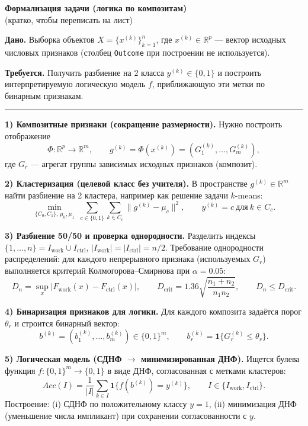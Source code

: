 \documentclass[a4paper,12pt]{article}
\begin{document}
\begin{center}
{\Large \textbf{Формализация задачи (логика по композитам)}}\\
\vspace{2pt}
{\small (кратко, чтобы переписать на лист)}
\end{center}

\textbf{Дано.}
Выборка объектов \(X=\{x^{(k)}\}_{k=1}^{n}\), где \(x^{(k)}\in\mathbb{R}^{p}\) --- вектор исходных числовых признаков (столбец \texttt{Outcome} при построении не используется).

\textbf{Требуется.}
Получить разбиение на 2 класса \(y^{(k)}\in\{0,1\}\) и построить интерпретируемую логическую модель \(f\), приближающую эти метки по бинарным признакам.

\hrule

\textbf{1) Композитные признаки (сокращение размерности).}
Нужно построить отображение
\[
\Phi:\mathbb{R}^{p}\to\mathbb{R}^{m},\qquad g^{(k)}=\Phi(x^{(k)})=(G_1^{(k)},\dots,G_m^{(k)}),
\]
где \(G_r\) --- агрегат группы зависимых исходных признаков (композит).

\textbf{2) Кластеризация (целевой класс без учителя).}
В пространстве \(g^{(k)}\in\mathbb{R}^{m}\) найти разбиение на 2 кластера, например как решение задачи \(k\)-means:
\[
\min_{\{C_0,C_1\},\,\mu_0,\mu_1}\;\sum_{c\in\{0,1\}}\sum_{k\in C_c}\|g^{(k)}-\mu_c\|^2,
\qquad y^{(k)}=c\ \text{для}\ k\in C_c.
\]

\textbf{3) Разбиение 50/50 и проверка однородности.}
Разделить индексы \(\{1,\dots,n\}=I_{\text{work}}\cup I_{\text{ctrl}}\), \(|I_{\text{work}}|=|I_{\text{ctrl}}|=n/2\).
Требование однородности распределений: для каждого непрерывного признака (используемых \(G_r\)) выполняется критерий Колмогорова--Смирнова при \(\alpha=0.05\):
\[
D_n=\sup_x\bigl|F_{\text{work}}(x)-F_{\text{ctrl}}(x)\bigr|,\qquad
D_{\text{crit}}=1.36\sqrt{\frac{n_1+n_2}{n_1n_2}},\qquad
D_n\le D_{\text{crit}}.
\]

\textbf{4) Бинаризация признаков для логики.}
Для каждого композита задаётся порог \(\theta_r\) и строится бинарный вектор:
\[
b^{(k)}=(b_1^{(k)},\dots,b_m^{(k)})\in\{0,1\}^m,\qquad
b_r^{(k)}=\mathbf{1}\{G_r^{(k)}\le \theta_r\}.
\]

\textbf{5) Логическая модель (СДНФ \(\rightarrow\) минимизированная ДНФ).}
Ищется булева функция \(f:\{0,1\}^m\to\{0,1\}\) в виде ДНФ, согласованная с метками кластеров:
\[
Acc(I)=\frac{1}{|I|}\sum_{k\in I}\mathbf{1}\{f(b^{(k)})=y^{(k)}\},\qquad I\in\{I_{\text{work}},I_{\text{ctrl}}\}.
\]
Построение: (i) СДНФ по положительному классу \(y=1\), (ii) минимизация ДНФ (уменьшение числа импликант) при сохранении согласованности с \(y\).
\end{document}
